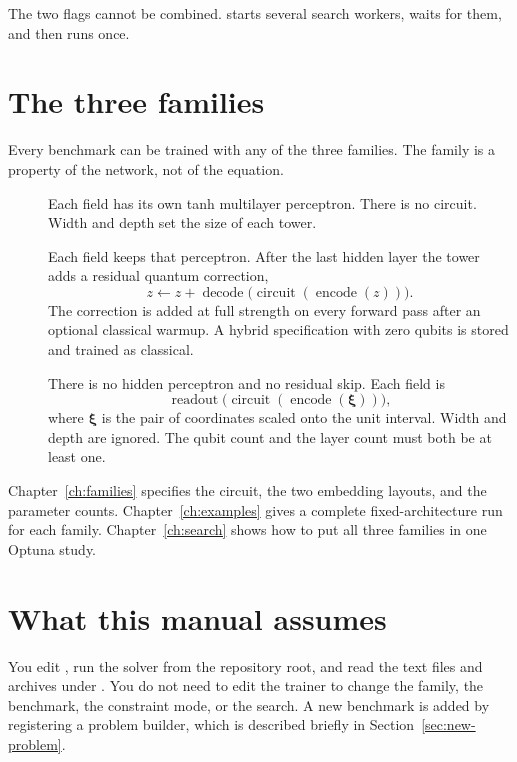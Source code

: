 The two flags cannot be combined.
 starts several search workers, waits for them, and then runs  once.

\section{The three families}

Every benchmark can be trained with any of the three families.
The family is a property of the network, not of the equation.

\begin{description}
\item[]
Each field has its own tanh multilayer perceptron.
There is no circuit.
Width and depth set the size of each tower.

\item[]
Each field keeps that perceptron.
After the last hidden layer the tower adds a residual quantum correction,
\[
z \leftarrow z + \operatorname{decode}\!\big(\operatorname{circuit}(\operatorname{encode}(z))\big).
\]
The correction is added at full strength on every forward pass after an optional classical warmup.
A hybrid specification with zero qubits is stored and trained as classical.

\item[]
There is no hidden perceptron and no residual skip.
Each field is
\[
\operatorname{readout}\!\big(\operatorname{circuit}(\operatorname{encode}(\boldsymbol{\xi}))\big),
\]
where \(\boldsymbol{\xi}\) is the pair of coordinates scaled onto the unit interval.
Width and depth are ignored.
The qubit count and the layer count must both be at least one.
\end{description}

Chapter~\ref{ch:families} specifies the circuit, the two embedding layouts, and the parameter counts.
Chapter~\ref{ch:examples} gives a complete fixed-architecture run for each family.
Chapter~\ref{ch:search} shows how to put all three families in one Optuna study.

\section{What this manual assumes}

You edit , run the solver from the repository root, and read the text files and archives under .
You do not need to edit the trainer to change the family, the benchmark, the constraint mode, or the search.
A new benchmark is added by registering a problem builder, which is described briefly in Section~\ref{sec:new-problem}.
